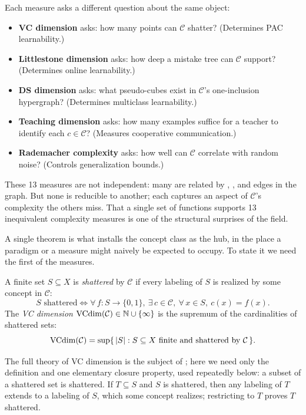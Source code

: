 Each measure asks a different question about the same object:

\begin{itemize}[leftmargin=*,itemsep=2pt]
\item \textbf{VC dimension} asks: how many points can $\mathcal{C}$ shatter? (Determines PAC learnability.)
\item \textbf{Littlestone dimension} asks: how deep a mistake tree can $\mathcal{C}$ support? (Determines online learnability.)
\item \textbf{DS dimension} asks: what pseudo-cubes exist in $\mathcal{C}$'s one-inclusion hypergraph? (Determines multiclass learnability.)
\item \textbf{Teaching dimension} asks: how many examples suffice for a teacher to identify each $c \in \mathcal{C}$? (Measures cooperative communication.)
\item \textbf{Rademacher complexity} asks: how well can $\mathcal{C}$ correlate with random noise? (Controls generalization bounds.)
\end{itemize}

These 13 measures are not independent: many are related by , , and  edges in the graph. But none is reducible to another; each captures an aspect of $\mathcal{C}$'s complexity the others miss. That a single set of functions supports 13 inequivalent complexity measures is one of the structural surprises of the field.

A single theorem is what installs the concept class as the hub, in the place a paradigm or a measure might naively be expected to occupy. To state it we need the first of the measures.

\begin{defn}
\label{def:shatter-vc}
A finite set $S \subseteq X$ is \emph{shattered} by $\mathcal{C}$ if every labeling of $S$ is realized by some concept in $\mathcal{C}$:
\[
\text{$S$ shattered} \iff \forall\, f : S \to \{0,1\},\ \exists\, c \in \mathcal{C},\ \forall\, x \in S,\ c(x) = f(x).
\]
The \emph{VC dimension} $\mathrm{VCdim}(\mathcal{C}) \in \mathbb{N} \cup \{\infty\}$ is the supremum of the cardinalities of shattered sets:
\[
\mathrm{VCdim}(\mathcal{C}) = \sup\{\,|S| : S \subseteq X \text{ finite and shattered by } \mathcal{C}\,\}.
\]
\end{defn}

The full theory of VC dimension is the subject of ; here we need only the definition and one elementary closure property, used repeatedly below: a subset of a shattered set is shattered. If $T \subseteq S$ and $S$ is shattered, then any labeling of $T$ extends to a labeling of $S$, which some concept realizes; restricting to $T$ proves $T$ shattered.


